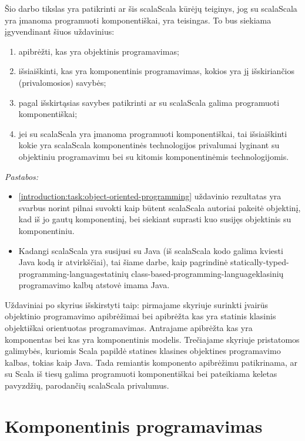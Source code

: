 Šio darbo tikslas yra patikrinti ar šis \gls{scala}{Scala} kūrėjų
teiginys, jog su \gls{scala}{Scala} yra įmanoma programuoti
komponentiškai, yra teisingas. To bus siekiama įgyvendinant šiuos
uždavinius:
\begin{enumerate}
  \item \label{introduction:task:object-oriented-programming}
    apibrėžti, kas yra objektinis programavimas;
  \item išsiaiškinti, kas yra komponentinis programavimas, kokios
    yra jį išskiriančios (privalomosios) savybės;
  \item pagal išskirtąsias savybes patikrinti ar su \gls{scala}{Scala}
    galima programuoti komponentiškai;
  \item jei su \gls{scala}{Scala} yra įmanoma programuoti
    komponentiškai, tai išsiaiškinti kokie yra \gls{scala}{Scala}
    komponentinės technologijos privalumai lyginant su objektiniu
    programavimu bei su kitomis komponentinėmis technologijomis.
\end{enumerate}
\emph{Pastabos:}
\begin{itemize}
  \item \ref{introduction:task:object-oriented-programming}
    uždavinio rezultatas yra svarbus norint pilnai suvokti kaip būtent
    \gls{scala}{Scala} autoriai pakeitė objektinį, kad iš jo gautų
    komponentinį, bei siekiant suprasti kuo susijęs objektinis su
    komponentiniu.
  \item Kadangi \gls{scala}{Scala} yra susijusi su Java (iš
    \gls{scala}{Scala} kodo galima kviesti Java kodą ir atvirkščiai),
    tai šiame darbe, kaip pagrindinė
    \gls{statically-typed-programming-language}{statinių}
    \gls{class-based-programming-language}{klasinių}
     programavimo kalbų atstovė imama Java.
\end{itemize}

Uždaviniai po skyrius išskirstyti taip: pirmajame skyriuje surinkti
įvairūs objektinio programavimo apibrėžimai bei apibrėžta kas
yra statinis klasinis objektiškai orientuotas programavimas.
Antrajame apibrėžta kas yra komponentas bei kas yra komponentinis modelis.
Trečiajame skyriuje pristatomos galimybės, kuriomis Scala
papildė statines klasines objektines programavimo kalbas, tokias
kaip Java. Tada remiantis komponento apibrėžimu patikrinama, ar
su Scala iš tiesų galima programuoti komponentiškai bei pateikiama
keletas pavyzdžių, parodančių \gls{scala}{Scala} privalumus.

\chapter{Komponentinis programavimas}

